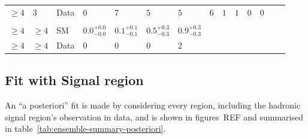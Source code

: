 \begin{landscape}
\begin{center}
\begin{table}[h!]
\begin{tabular}{ llllllllllllll }
    $\geq 4$             & $3$      & Data & $0$                   & $7$                  & $5$                  & $5$                  & $6$                  & $1$                  & $1$                  & $0$                  & $0$                  & \multicolumn{2}{c}{}                      \\\\ 
    $\geq 4$             & $\geq 4$ & SM   & $0.0^{+0.0}_{-0.0}$   & $0.1^{+0.1}_{-0.1}$  & $0.5^{+0.3}_{-0.3}$  & $0.9^{+0.3}_{-0.3}$  & \multicolumn{7}{l}{}                                                                                                                                         \\ 
    $\geq 4$             & $\geq 4$ & Data & $0$                   & $0$                  & $0$                  & $2$                  & \multicolumn{7}{l}{}                                                                                                                                         \\ 
    \hline
    \hline
  \end{tabular}
\end{table}
\end{center}
\end{landscape}

\subsection{Fit with Signal region}
An ``a posteriori'' fit is made by considering every region, including the
hadronic signal region's observation in data, and is shown in
figures~REF and
summarised in table~\ref{tab:ensemble-summary-posteriori}.


